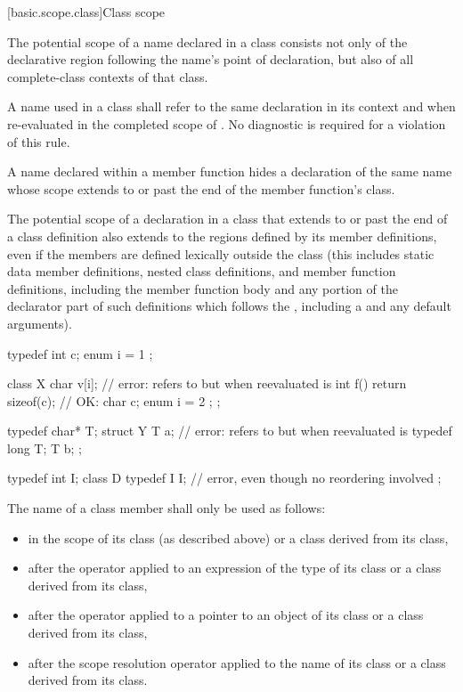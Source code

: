 [basic.scope.class]{Class scope}
%

\pnum
The potential scope of a name declared in a class consists not
only of the declarative region following the name's point of
declaration, but also of all complete-class contexts
of that class.

\pnum
A name  used in a class  shall refer to the same
declaration in its context and when re-evaluated in the completed scope
of . No diagnostic is required for a violation of this rule.

\pnum
A name declared within a member function hides a declaration of
the same name whose scope extends to or past the end of the member
function's class.

\pnum
The potential scope of a declaration in a class that extends to or past the
end of a class definition also extends to the regions defined by its
member definitions, even if the members are defined lexically outside
the class (this includes static data member definitions, nested class
definitions, and member function definitions, including the member function
body and any portion of the
declarator part of such definitions which follows the ,
including a  and any default
arguments).

\pnum
\begin{example}
\begin{codeblock}
typedef int  c;
enum { i = 1 };

class X {
  char  v[i];                       // error:  refers to  but when reevaluated is 
  int  f() { return sizeof(c); }    // OK: 
  char  c;
  enum { i = 2 };
};

typedef char*  T;
struct Y {
  T  a;                             // error:  refers to  but when reevaluated is 
  typedef long  T;
  T  b;
};

typedef int I;
class D {
  typedef I I;                      // error, even though no reordering involved
};
\end{codeblock}
\end{example}

\pnum
The name of a class member shall only be used as follows:
\begin{itemize}
\item in the scope of its class (as described above) or a class derived
from its class,
\item after the  operator applied to an expression of the type
of its class or a class derived from its class,
\item after the \tcode{->} operator applied to a pointer to an object of
its class or a class derived from its class,
\item after the \tcode{::} scope resolution operator
applied to the name of its class or a class derived from its class.
\end{itemize}

